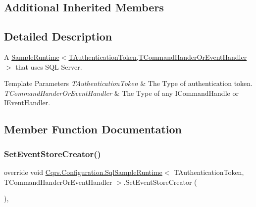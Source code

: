 \subsection*{Additional Inherited Members}


\subsection{Detailed Description}
A \hyperlink{classCqrs_1_1Configuration_1_1SampleRuntime_a9382e8b20b8701815ad20c1cd645c27b_a9382e8b20b8701815ad20c1cd645c27b}{Sample\+Runtime$<$\+T\+Authentication\+Token,\+T\+Command\+Hander\+Or\+Event\+Handler$>$} that uses S\+QL Server. 


\begin{DoxyTemplParams}{Template Parameters}
{\em T\+Authentication\+Token} & The Type of authentication token.\\
\hline
{\em T\+Command\+Hander\+Or\+Event\+Handler} & The Type of any I\+Command\+Handle or I\+Event\+Handler.\\
\hline
\end{DoxyTemplParams}


\subsection{Member Function Documentation}
\mbox{\label{classCqrs_1_1Configuration_1_1SqlSampleRuntime_ae2fedd0697e72a1283a098c809d832c9_ae2fedd0697e72a1283a098c809d832c9}} 
\subsubsection{\texorpdfstring{Set\+Event\+Store\+Creator()}{SetEventStoreCreator()}}
{\footnotesize\ttfamily override void \hyperlink{classCqrs_1_1Configuration_1_1SqlSampleRuntime}{Cqrs.\+Configuration.\+Sql\+Sample\+Runtime}$<$ T\+Authentication\+Token, T\+Command\+Hander\+Or\+Event\+Handler $>$.Set\+Event\+Store\+Creator (\begin{DoxyParamCaption}{ }\end{DoxyParamCaption})\hspace{0.3cm}{\ttfamily [protected]}, {\ttfamily [virtual]}}



